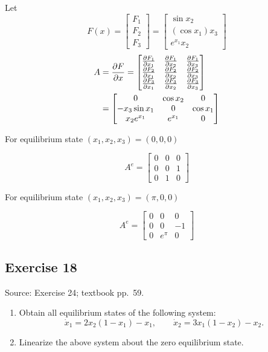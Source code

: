 \documentclass[12pt,a4paper]{article}
\newlength{\questionroom}
\newenvironment{questionprompt}{%
  \begin{lrbox}{\questionbox}\begin{minipage}{\linewidth}%
}{%
  \end{minipage}\end{lrbox}%
  \setlength{\questionroom}{\dimexpr\ht\questionbox+\dp\questionbox+5.2cm\relax}%
  \ifdim\questionroom>\textheight\setlength{\questionroom}{\textheight}\fi
  \Needspace{\questionroom}%
  \noindent\usebox{\questionbox}\par
}
\begin{document}
Let 
\[
F(x) = \begin{bmatrix}
	F_1 \\ F_2 \\ F_3
\end{bmatrix} = \begin{bmatrix}
\sin x_2 \\ (\cos x_1) x_3 \\ e^{x_1} x_2
\end{bmatrix}
\]
\begin{align*}
	A &= {\partial F \over \partial x} = \begin{bmatrix}
		{\partial F_1 \over \partial x_1} & {\partial F_1 \over \partial x_2} & {\partial F_1 \over \partial x_3} \\
		{\partial F_2 \over \partial x_1} & {\partial F_2 \over \partial x_2} & {\partial F_2 \over \partial x_3} \\
		{\partial F_3 \over \partial x_1} & {\partial F_3 \over \partial x_2} & {\partial F_3 \over \partial x_3} \\
	\end{bmatrix}\\
	&= \begin{bmatrix}
		0 & \cos x_2 &  0 \\
		-x_3 \sin x_1 & 0 & \cos x_1 \\
		x_2e^{x_1} & e^{x_1} & 0
	\end{bmatrix}
\end{align*}

For equilibrium state $(x_1, x_2, x_3)= (0, 0 , 0)$

\[
A^e = \begin{bmatrix}
	0 & 0 & 0 \\
	0 & 0 & 1 \\
	0 & 1 & 0
\end{bmatrix}
\]

For equilibrium state $(x_1, x_2, x_3) = (\pi, 0, 0)$

\[
A^e = \begin{bmatrix}
	0 & 0& 0  \\
	0 & 0 &  -1 \\
	0 & e^{\pi} & 0
\end{bmatrix}
\]

\vspace{3.5cm}

\begin{questionprompt}
\section*{Exercise 18}
\label{practice:18}
{\small Source: Exercise 24; textbook pp.~59.}\par
\begin{enumerate}[label=(\alph*)]
\item Obtain all equilibrium states of the following system:
\[\dot x_1=2x_2(1-x_1)-x_1,\qquad\dot x_2=3x_1(1-x_2)-x_2.\]
\item Linearize the above system about the zero equilibrium state.
\end{enumerate}
\end{questionprompt}
\end{document}
